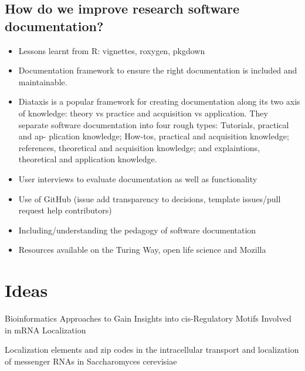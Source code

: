 \documentclass[../main.tex]{subfiles}
\begin{document}
\subsection{How do we improve research software documentation?}

\begin{itemize}
    \item Lessons learnt from R: vignettes, roxygen, pkgdown
    \item Documentation framework to ensure the right documentation is included and maintainable.
    \item Diataxis is a popular framework for creating documentation along its two axis of knowledge: theory vs practice and acquisition vs application. They separate software documentation into four rough types: Tutorials, practical and ap- plication knowledge; How-tos, practical and acquisition knowledge; references, theoretical and acquisition knowledge; and explaintions, theoretical and application knowledge. %
    \item User interviews to evaluate documentation as well as functionality
    \item Use of GitHub (issue add transparency to decisions, template issues/pull request help contributors)
    \item Including/understanding the pedagogy of software documentation
    \item Resources available on the Turing Way, open life science and Mozilla
\end{itemize}

\section{Ideas}

Bioinformatics Approaches to Gain Insights into cis-Regulatory Motifs Involved in mRNA Localization %

Localization elements and zip codes in the intracellular transport and localization of messenger RNAs in Saccharomyces cerevisiae

\end{document}
